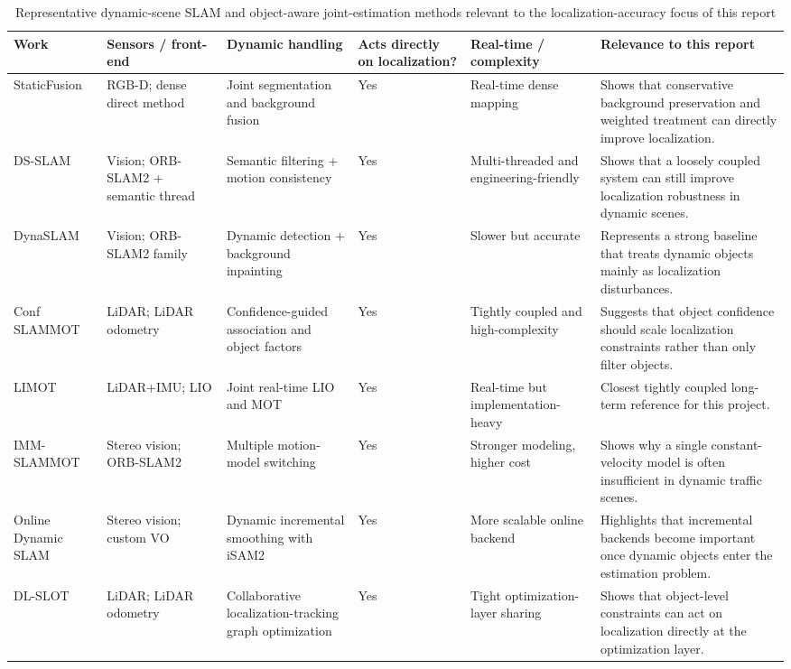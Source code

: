 \documentclass[a4paper,12pt]{article}
\begin{document}
\begin{table}[H]
    \centering
    \caption{Representative dynamic-scene SLAM and object-aware joint-estimation methods relevant to the localization-accuracy focus of this report}
    \label{tab:slammot_related_work}
    \footnotesize
    \setlength{\tabcolsep}{5pt}
    \begin{tabularx}{\textwidth}{p{1.9cm} p{2.3cm} p{2.3cm} p{1.7cm} p{2.0cm} X}
        \toprule
        Work & Sensors / front-end & Dynamic handling & Acts directly on localization? & Real-time / complexity & Relevance to this report \\
        \midrule
        StaticFusion & RGB-D; dense direct method & Joint segmentation and background fusion & Yes & Real-time dense mapping~\cite{staticfusion} & Shows that conservative background preservation and weighted treatment can directly improve localization. \\
        DS-SLAM & Vision; ORB-SLAM2 + semantic thread & Semantic filtering + motion consistency & Yes & Multi-threaded and engineering-friendly~\cite{ds-slam} & Shows that a loosely coupled system can still improve localization robustness in dynamic scenes. \\
        DynaSLAM & Vision; ORB-SLAM2 family & Dynamic detection + background inpainting & Yes & Slower but accurate~\cite{dynaslam} & Represents a strong baseline that treats dynamic objects mainly as localization disturbances. \\
        Conf SLAMMOT & LiDAR; LiDAR odometry & Confidence-guided association and object factors & Yes & Tightly coupled and high-complexity~\cite{confslammot} & Suggests that object confidence should scale localization constraints rather than only filter objects. \\
        LIMOT & LiDAR+IMU; LIO & Joint real-time LIO and MOT & Yes & Real-time but implementation-heavy~\cite{limot} & Closest tightly coupled long-term reference for this project. \\
        IMM-SLAMMOT & Stereo vision; ORB-SLAM2 & Multiple motion-model switching & Yes & Stronger modeling, higher cost~\cite{imm-slammot} & Shows why a single constant-velocity model is often insufficient in dynamic traffic scenes. \\
        Online Dynamic SLAM & Stereo vision; custom VO & Dynamic incremental smoothing with iSAM2 & Yes & More scalable online backend~\cite{online-dynamic-slam} & Highlights that incremental backends become important once dynamic objects enter the estimation problem. \\
        DL-SLOT & LiDAR; LiDAR odometry & Collaborative localization-tracking graph optimization & Yes & Tight optimization-layer sharing~\cite{dl-slot} & Shows that object-level constraints can act on localization directly at the optimization layer. \\
        \bottomrule
    \end{tabularx}
\end{table}
\end{document}
